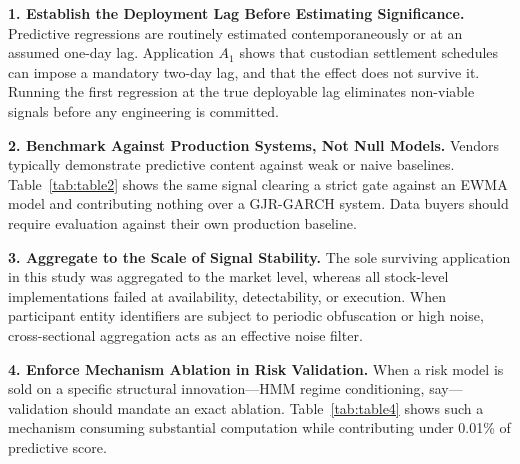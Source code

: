 \documentclass{ieeeaccess}
\begin{document}
\textbf{1. Establish the Deployment Lag Before Estimating Significance.} Predictive regressions are routinely estimated contemporaneously or at an assumed one-day lag. Application $A_1$ shows that custodian settlement schedules can impose a mandatory two-day lag, and that the effect does not survive it. Running the first regression at the true deployable lag eliminates non-viable signals before any engineering is committed.

\textbf{2. Benchmark Against Production Systems, Not Null Models.} Vendors typically demonstrate predictive content against weak or naive baselines. Table~\ref{tab:table2} shows the same signal clearing a strict gate against an EWMA model and contributing nothing over a GJR-GARCH system. Data buyers should require evaluation against their own production baseline.

\textbf{3. Aggregate to the Scale of Signal Stability.} The sole surviving application in this study was aggregated to the market level, whereas all stock-level implementations failed at availability, detectability, or execution. When participant entity identifiers are subject to periodic obfuscation or high noise, cross-sectional aggregation acts as an effective noise filter.

\textbf{4. Enforce Mechanism Ablation in Risk Validation.} When a risk model is sold on a specific structural innovation---HMM regime conditioning, say---validation should mandate an exact ablation. Table~\ref{tab:table4} shows such a mechanism consuming substantial computation while contributing under 0.01\% of predictive score.
\end{document}
